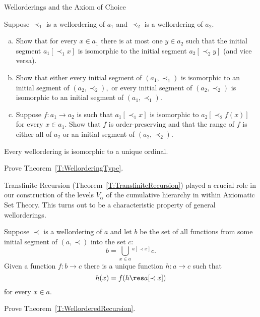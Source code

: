 \begin{unit}{Wellorderings and the Axiom of Choice}
\begin{problem}
  Suppose \(\prec_1\) is a wellordering of \(a_1\) and \(\prec_2\) is a wellordering of \(a_2.\)
  \begin{enumerate}[(a)]
  \item Show that for every \(x \in a_1\) there is at most one \(y \in a_2\) such that the initial segment \(a_1[{\prec_1 x}]\) is isomorphic to the initial segment \(a_2[{\prec_2 y}]\) (and vice versa).
  \item Show that either every initial segment of \((a_1,{\prec_1})\) is isomorphic to an initial segment of \((a_2,{\prec_2}),\) or every initial segment of \((a_2,{\prec_2})\) is isomorphic to an initial segment of \((a_1,{\prec_1}).\)
  \item Suppose \(f:a_1 \to a_2\) is such that \(a_1[{\prec_1 x}]\) is isomorphic to \(a_2[{\prec_2 f(x)}]\) for every \(x \in a_1.\)
    Show that \(f\) is order-preserving and that the range of \(f\) is either all of \(a_2\) or an initial segment of \((a_2,{\prec_2}).\)
  \end{enumerate}
\end{problem}

\begin{theorem}\label{T:WellorderingType}
  Every wellordering is isomorphic to a unique ordinal.
\end{theorem}

\begin{problem}
  Prove Theorem~\ref{T:WellorderingType}.
\end{problem}

Transfinite Recursion (Theorem~\ref{T:TransfiniteRecursion}) played a crucial role in our construction of the levels \(V_\alpha\) of the cumulative hierarchy in within Axiomatic Set Theory.
This turns out to be a characteristic property of general wellorderings.

\begin{theorem}\label{T:WellorderedRecursion}
  Suppose \({\prec}\) is a wellordering of \(a\) and let \(b\) be the set of all functions from some initial segment of \((a,{\prec})\) into the set \(c:\) \[b = \bigcup_{x \in a} {}^{a[{\prec x}]}c.\]  
  Given a function \(f:b \to c\) there is a unique function \(h:a \to c\) such that \[h(x) = f(h \res a[{\prec x}])\] for every \(x \in a.\)
\end{theorem}

\begin{problem}
  Prove Theorem~\ref{T:WellorderedRecursion}.
\end{problem}


\end{unit}
